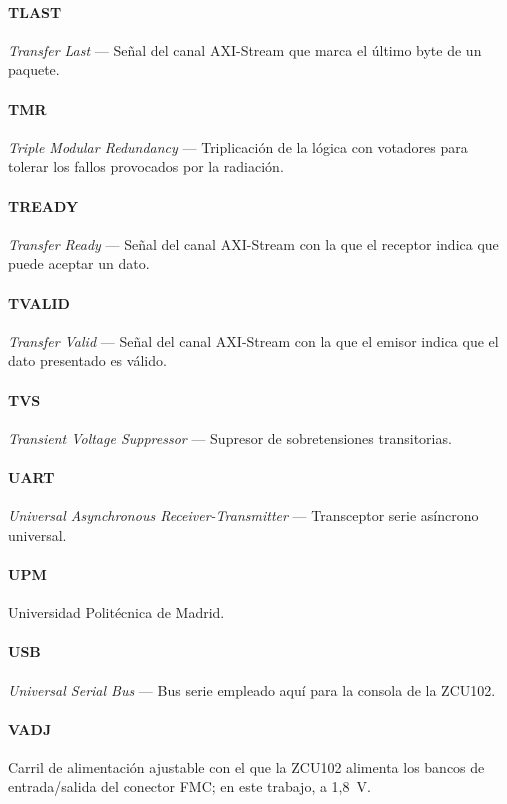 \paragraph{TLAST} \textit{Transfer Last} --- Señal del canal AXI-Stream que marca el último byte de un paquete.

\paragraph{TMR} \textit{Triple Modular Redundancy} --- Triplicación de la lógica con votadores para tolerar los fallos provocados por la radiación.

\paragraph{TREADY} \textit{Transfer Ready} --- Señal del canal AXI-Stream con la que el receptor indica que puede aceptar un dato.

\paragraph{TVALID} \textit{Transfer Valid} --- Señal del canal AXI-Stream con la que el emisor indica que el dato presentado es válido.

\paragraph{TVS} \textit{Transient Voltage Suppressor} --- Supresor de sobretensiones transitorias.

\paragraph{UART} \textit{Universal Asynchronous Receiver-Transmitter} --- Transceptor serie asíncrono universal.

\paragraph{UPM} Universidad Politécnica de Madrid.

\paragraph{USB} \textit{Universal Serial Bus} --- Bus serie empleado aquí para la consola de la ZCU102.

\paragraph{VADJ} Carril de alimentación ajustable con el que la ZCU102 alimenta los bancos de entrada/salida del conector FMC; en este trabajo, a 1,8~V.

